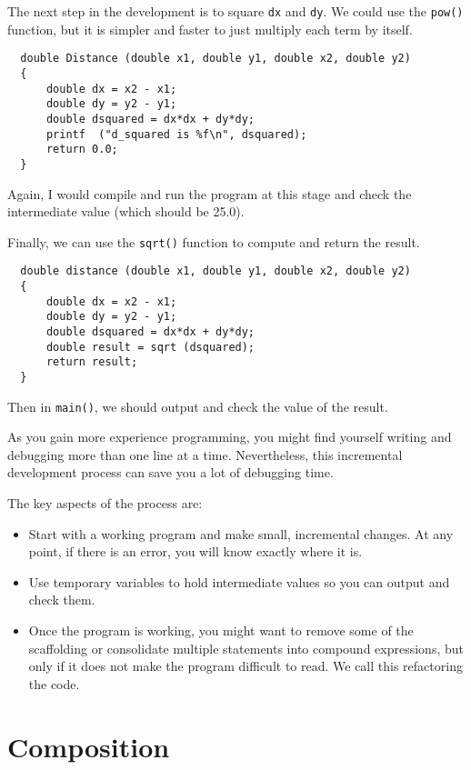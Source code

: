The next step in the development is to square {\tt dx} and {\tt dy}.
We could use the {\tt pow()} function, but it is simpler and
faster to just multiply each term by itself.

\begin{verbatim}
  double Distance (double x1, double y1, double x2, double y2)
  {
      double dx = x2 - x1;
      double dy = y2 - y1;
      double dsquared = dx*dx + dy*dy;
      printf  ("d_squared is %f\n", dsquared);
      return 0.0;
  }
\end{verbatim}
%
Again, I would compile and run the program at this stage
and check the intermediate value (which should be 25.0).

Finally, we can use the {\tt sqrt()} function to compute and
return the result.

\begin{verbatim}
  double distance (double x1, double y1, double x2, double y2) 
  {
      double dx = x2 - x1;
      double dy = y2 - y1;
      double dsquared = dx*dx + dy*dy;
      double result = sqrt (dsquared);
      return result;
  }
\end{verbatim}
%
Then in {\tt main()}, we should output and check the value of the result.

As you gain more experience programming, you might find yourself
writing and debugging more than one line at a time.  Nevertheless,
this incremental development process can save you a lot of
debugging time.

The key aspects of the process are:

\begin{itemize}

\item Start with a working program and make small, incremental
changes.  At any point, if there is an error, you will know
exactly where it is.

\item Use temporary variables to hold intermediate values so
you can output and check them.

\item Once the program is working, you might want to remove
some of the scaffolding or consolidate multiple statements into
compound expressions, but only if it does not make the program
difficult to read. We call this refactoring the code.

\end{itemize}

\section{Composition}

